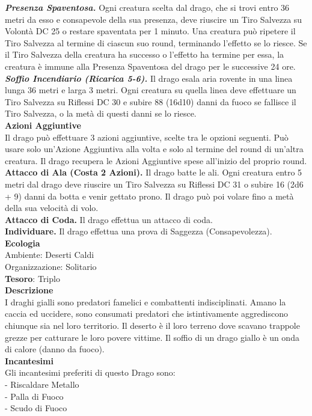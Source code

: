 \begin{multicols}{2}
\textit{\textbf{Presenza Spaventosa.}} Ogni creatura scelta dal drago, che si trovi entro 36 metri da esso e consapevole della sua presenza, deve riuscire un Tiro Salvezza su Volontà DC 25 o restare spaventata per 1 minuto. Una creatura può ripetere il Tiro Salvezza al termine di ciascun suo round, terminando l'effetto se lo riesce. Se il Tiro Salvezza della creatura ha successo o l'effetto ha termine per essa, la creatura è immune alla Presenza Spaventosa del drago per le successive 24 ore.\\
\textit{\textbf{Soffio Incendiario (Ricarica 5-6).}} Il drago esala aria rovente in una linea lunga 36 metri e larga 3 metri. Ogni creatura su quella linea deve effettuare un Tiro Salvezza su Riflessi DC 30 e subire 88 (16d10) danni da fuoco se fallisce il Tiro Salvezza, o la metà di questi danni se lo riesce.\\
\textbf{Azioni Aggiuntive}\\
Il drago può effettuare 3 azioni aggiuntive, scelte tra le opzioni seguenti. Può usare solo un'Azione Aggiuntiva alla volta e solo al termine del round di un'altra creatura. Il drago recupera le Azioni Aggiuntive spese all'inizio del proprio round.\\
\textbf{Attacco di Ala (Costa 2 Azioni).} Il drago batte le ali. Ogni creatura entro 5 metri dal drago deve riuscire un Tiro Salvezza su Riflessi DC 31 o subire 16 (2d6 + 9) danni da botta e venir gettato prono. Il drago può poi volare fino a metà della sua velocità di volo.\\
\textbf{Attacco di Coda.} Il drago effettua un attacco di coda.\\
\textbf{Individuare.} Il drago effettua una prova di Saggezza (Consapevolezza).\\
\textbf{Ecologia}\\
Ambiente: Deserti Caldi\\
Organizzazione: Solitario\\
\textbf{Tesoro}: Triplo\\
\textbf{Descrizione}\\
I draghi gialli sono predatori famelici e combattenti indisciplinati. Amano la caccia ed uccidere, sono consumati predatori che istintivamente aggrediscono chiunque sia nel loro territorio. Il deserto è il loro terreno dove scavano trappole grezze per catturare le loro povere vittime.
Il soffio di un drago giallo è un onda di calore (danno da fuoco).
\\
\textbf{Incantesimi}\\
Gli incantesimi preferiti di questo Drago sono:\\
- Riscaldare Metallo\\
- Palla di Fuoco\\
- Scudo di Fuoco



\end{multicols}
